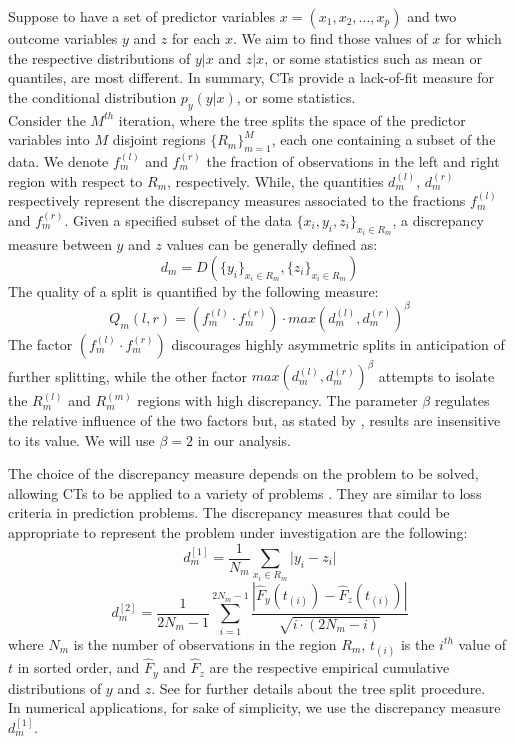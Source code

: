 \documentclass[fleqn,10pt]{wlscirep}
\begin{document}
Suppose to have a set of predictor variables $x = (x_1, x_2,...,x_p)$ and two outcome variables $y$ and $z$ for each $x$. We aim to find those values of $x$ for which the respective distributions of $y | x$ and $z | x$, or some statistics such as mean or quantiles, are most different. In summary, CTs provide a lack-of-fit measure for the conditional distribution $p_y(y | x)$, or some statistics.\\
Consider the $M^{th}$ iteration, where the tree splits the space of the predictor variables into $M$ disjoint regions $\lbrace R_m\rbrace^M_{m=1}$, each one containing a subset of the data. We denote $f_m^{(l)}$ and $f_m^{(r)}$ the fraction of observations in the left and right region with respect to $R_m$, respectively. While, the quantities $d_m^{(l)}$, $d_m^{(r)}$ respectively represent the discrepancy measures associated to the fractions $f_m^{(l)}$ and $f_m^{(r)}$. Given a specified subset of the data $\lbrace x_i,y_i,z_i \rbrace_{x_i\in R_m}$, a discrepancy measure between $y$ and $z$ values can be generally defined as:
\begin{equation}
\label{eq:dm}
d_m=D\left( \lbrace y_i\rbrace_{x_i\in R_m},\lbrace z_i\rbrace_{x_i\in R_m}\right)
\end{equation}
The quality of a split is quantified by the following measure:
\begin{equation}
Q_m(l,r)=\left(f_m^{(l)} \cdot f_m^{(r)}\right) \cdot max\left(d_m^{(l)}, d_m^{(r)} \right)^{\beta}
\end{equation}
The factor $\left(f_m^{(l)} \cdot f_m^{(r)}\right)$ discourages highly asymmetric splits in anticipation of further splitting, while the other factor $max\left(d_m^{(l)}, d_m^{(r)} \right)^{\beta}$ attempts to isolate the $R_m^{(l)}$ and $R_m^{(m)}$ regions with high discrepancy. The parameter $\beta$ regulates the relative influence of the two factors but, as stated by \cite{Friedman2020}, results are insensitive to its value. We will use $\beta=2$ in our analysis.

The choice of the discrepancy measure depends on the problem to be solved, allowing CTs to be applied to a variety of problems \cite{Friedman2020}. They are similar to loss criteria in prediction problems. 
The discrepancy measures that could be appropriate to represent the problem under investigation are the following:
\begin{equation}
\label{eq:dm1}
d_m^{[1]} = \frac{1}{N_m} \sum_{x_i \in R_m} \lvert y_i-z_i \rvert
\end{equation}
%
\begin{equation}
\label{eq:dm2}
d_m^{[2]} = \frac{1}{2N_m-1} \sum_{i =1}^{2N_m-1} \frac{\left| \hat{F}_y(t_{(i)})-\hat{F}_z(t_{(i)})\right|}{\sqrt{i\cdot(2N_m-i)}}
\end{equation}
where $N_m$ is the number of observations in the region $R_m$,  $t_{(i)}$ is the $i^{th}$ value of $t$ in sorted order, and $\hat{F}_y$ and $\hat{F}_z$ are the respective empirical cumulative distributions of $y$ and $z$. See \cite{Friedman2020} for further details about the tree split procedure.\\
In numerical applications, for sake of simplicity, we use the discrepancy measure $d_m^{[1]}$.
\end{document}
